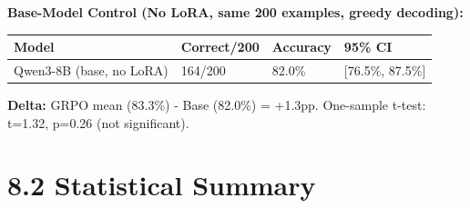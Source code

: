 \documentclass[
  american,
  11pt,
  a4paper,
  oneside]{report}
\newcounter{none} %
\begin{document}
\textbf{Base-Model Control (No LoRA, same 200 examples, greedy
decoding):}

{\def\LTcaptype{none} %
\begin{longtable}[]{@{}llll@{}}
\toprule\noalign{}
Model & Correct/200 & Accuracy & 95\% CI \\
\midrule\noalign{}
\endhead
\bottomrule\noalign{}
\endlastfoot
Qwen3-8B (base, no LoRA) & 164/200 & 82.0\% & {[}76.5\%, 87.5\%{]} \\
\end{longtable}
}

\textbf{Delta:} GRPO mean (83.3\%) - Base (82.0\%) = +1.3pp. One-sample
t-test: t=1.32, p=0.26 (not significant).

\section{8.2 Statistical Summary}\label{statistical-summary}
\end{document}
